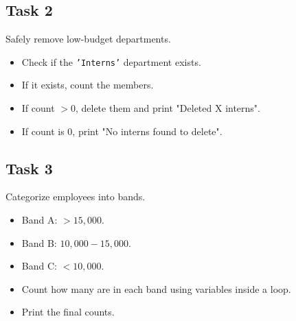 \documentclass[12pt,a4paper]{article}
\newif\ifshowsolutions
\begin{document}
\ifshowsolutions
\textbf{Solution:}
\begin{lstlisting}[language=SQL]
DO $$ 
DECLARE
    r RECORD;
    v_min NUMERIC := 999999;
    v_max NUMERIC := 0;
BEGIN
    FOR r IN SELECT salary FROM employees LOOP
        
        IF r.salary > v_max THEN
            v_max := r.salary;
        END IF;

        IF r.salary < v_min THEN
            v_min := r.salary;
        END IF;

    END LOOP;
    
    RAISE NOTICE 'Found Max: %, Found Min: %', v_max, v_min;
END $$;
\end{lstlisting}
\fi

\subsection*{Task 2}
Safely remove low-budget departments.
\begin{itemize}
    \item Check if the \texttt{'Interns'} department exists.
    \item If it exists, count the members.
    \item If count $> 0$, delete them and print "Deleted X interns".
    \item If count is 0, print "No interns found to delete".
\end{itemize}

\ifshowsolutions
\textbf{Solution:}
\begin{lstlisting}[language=SQL]
DO $$ 
DECLARE
    v_count INT;
BEGIN
    SELECT COUNT(*) INTO v_count FROM employees WHERE department = 'Interns';

    IF v_count > 0 THEN
        DELETE FROM employees WHERE department = 'Interns';
        RAISE NOTICE 'Deleted % interns', v_count;
    ELSE
        RAISE NOTICE 'No interns found to delete';
    END IF;
END $$;
\end{lstlisting}
\fi

\subsection*{Task 3}
Categorize employees into bands.
\begin{itemize}
    \item Band A: $> 15,000$.
    \item Band B: $10,000 - 15,000$.
    \item Band C: $< 10,000$.
    \item Count how many are in each band using variables inside a loop.
    \item Print the final counts.
\end{itemize}
\end{document}
